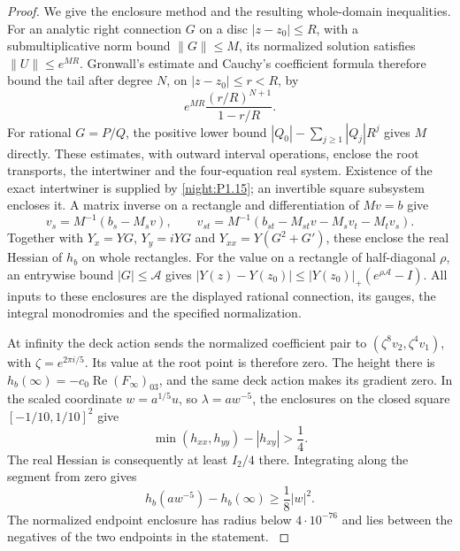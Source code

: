 \begin{proof}
We give the enclosure method and the resulting whole-domain
inequalities. For an analytic right connection $G$ on a disc
$|z-z_0|\le R$, with a submultiplicative norm bound $\|G\|\le M$,
its normalized solution satisfies $\|U\|\le e^{MR}$.
Gronwall's estimate and Cauchy's coefficient formula therefore
bound the tail after degree $N$, on $|z-z_0|\le r<R$, by
\[
 e^{MR}\frac{(r/R)^{N+1}}{1-r/R}.
\]
For rational $G=P/Q$, the positive lower bound
$|Q_0|-\sum_{j\ge1}|Q_j|R^j$ gives $M$ directly.
These estimates, with outward interval operations, enclose the
root transports, the intertwiner and the four-equation real
system. Existence of the exact intertwiner is supplied by
\cref{night:P1.15}; an invertible square subsystem encloses it.
A matrix inverse on a rectangle and differentiation of
$Mv=b$ give
\[
 v_s=M^{-1}(b_s-M_sv),\qquad
 v_{st}=M^{-1}(b_{st}-M_{st}v-M_sv_t-M_tv_s).
\]
Together with $Y_x=YG$, $Y_y=iYG$ and
$Y_{xx}=Y(G^2+G')$, these enclose the real Hessian of $h_b$
on whole rectangles. For the value on a rectangle of
half-diagonal $\rho$, an entrywise bound $|G|\le\mathcal A$
gives
$|Y(z)-Y(z_0)|\le|Y(z_0)|_+(e^{\rho\mathcal A}-I)$.
All inputs to these enclosures are the displayed rational
connection, its gauges, the integral monodromies and the specified
normalization.

At infinity the deck action sends the normalized coefficient
pair to $(\zeta^8v_2,\zeta^4v_1)$, with
$\zeta=e^{2\pi i/5}$. Its value at the root point is therefore
zero. The height there is
$h_b(\infty)=-c_0\operatorname{Re}(F_\infty)_{03}$,
and the same deck action makes its gradient zero.
In the scaled coordinate $w=a^{1/5}u$, so $\lambda=aw^{-5}$,
the enclosures on the closed square $[-1/10,1/10]^2$ give
\[
 \min(h_{xx},h_{yy})-|h_{xy}|>\frac14.
\]
The real Hessian is consequently at least $I_2/4$ there.
Integrating along the segment from zero gives
\[
 h_b(aw^{-5})-h_b(\infty)\ge\frac18|w|^2.
\]
The normalized endpoint enclosure has radius below $4\cdot10^{-76}$
and lies between the negatives of the two endpoints in the statement.
\hypertarget{tag-03KY}{}\label{layout:V:fresh-minimum}


\end{proof}
